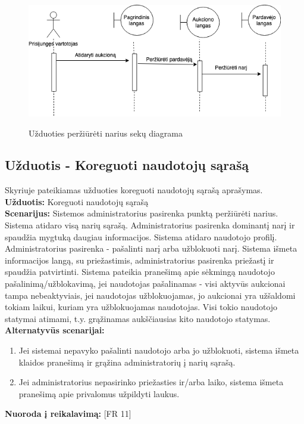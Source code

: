 \documentclass{VUMIFPSkursinis}
\begin{document}
			\begin{figure}[H]
		\centering
		\includegraphics[width=\linewidth]{img/viewSellerSequence.png}
		\label{fig:narys}
		\caption{Užduoties peržiūrėti narius sekų diagrama}
	\end{figure}

	\subsection{Užduotis - Koreguoti naudotojų sąrašą}
	Skyriuje pateikiamas užduoties koreguoti naudotojų sąrašą aprašymas.\\
	\textbf{Užduotis:}  Koreguoti naudotojų sąrašą \\
	\textbf{Scenarijus:} Sistemos administratorius pasirenka punktą peržiūrėti narius. Sistema atidaro visą narių sąrašą. Administratorius pasirenka dominantį narį ir spaudžia mygtuką daugiau informacijos. Sistema atidaro naudotojo profilį. Administratorius pasirenka - pašalinti narį arba užblokuoti narį. Sistema išmeta informacijos langą, su priežastimis, administratorius pasirenka priežastį ir spaudžia patvirtinti. Sistema pateikia pranešimą apie sėkmingą naudotojo pašalinimą/užblokavimą, jei naudotojas pašalinamas - visi aktyvūs aukcionai tampa nebeaktyviais, jei naudotojas užblokuojamas, jo aukcionai yra užšaldomi tokiam laikui, kuriam yra užblokuojamas naudotojas. Visi tokio naudotojo statymai atimami, t.y. grąžinamas aukščiausias kito naudotojo statymas. \\
	\textbf{Alternatyvūs scenarijai:}
	\begin{enumerate}
		\item Jei sistemai nepavyko pašalinti naudotojo arba jo užblokuoti, sistema išmeta klaidos pranešimą ir grąžina administratorių į narių sąrašą.
		\item Jei administratorius nepasirinko priežasties ir/arba laiko, sistema išmeta pranešimą apie privalomus užpildyti laukus.
	\end{enumerate}
	\textbf{Nuoroda į reikalavimą: } [FR 11]
	
\end{document}

